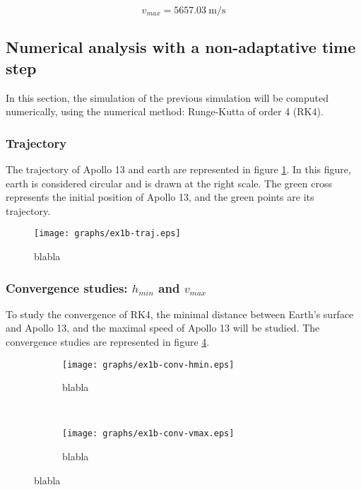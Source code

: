 \documentclass[a4paper,12pt,twoside]{article}
\begin{document}
\begin{equation}
  v_{max} = \SI{5657.03}{\meter\per\second} %
  \label{eq:1a-vitesse-max}
\end{equation}




\subsection{Numerical analysis with a non-adaptative time step}
In this section, the simulation of the previous simulation will be computed numerically, using the numerical method: Runge-Kutta of order 4 (RK4).

\subsubsection{Trajectory}
The trajectory of Apollo 13 and earth are represented in figure \ref{fig:1b-trajectory-non-adaptative}.
In this figure, earth is considered circular and is drawn at the right scale.
The green cross represents the initial position of Apollo 13, and the green points are its trajectory.

\begin{figure}[h]
  \centering
  \texttt{[image: graphs/ex1b-traj.eps]}
  \caption{blabla}
  \label{fig:1b-trajectory-non-adaptative}
\end{figure}


\subsubsection{Convergence studies: $h_{min}$ and $v_{max}$}
To study the convergence of RK4, the minimal distance between Earth's surface and Apollo 13, and the maximal speed of Apollo 13 will be studied.
The convergence studies are represented in figure \ref{fig:1b-conv}.

\begin{figure}[h]
  \centering
  \begin{subfigure}[t]{0.45\textwidth}
    \texttt{[image: graphs/ex1b-conv-hmin.eps]}
    \caption{blabla}
    \label{fig:1b-conv-hmin}
  \end{subfigure}
  ~
  \begin{subfigure}[t]{0.45\textwidth}
    \texttt{[image: graphs/ex1b-conv-vmax.eps]}
    \caption{blabla}
    \label{fig:1b-conv-vmax}
  \end{subfigure}
  \caption{blabla}
  \label{fig:1b-conv}
\end{figure}
\end{document}
